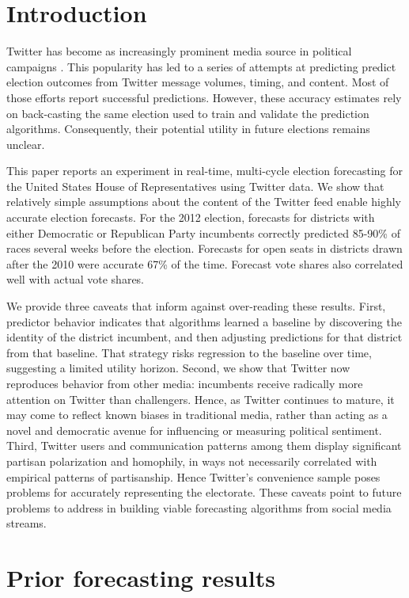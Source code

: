 \documentclass{acm_proc_article-sp}
\begin{document}
\section{Introduction}
\label{sec:introduction}

Twitter has become as increasingly prominent media source in political campaigns
\cite{economist2009,harden2009}. This popularity has led to a series
of attempts at predicting predict election outcomes from Twitter
message volumes, timing, and content. Most of those efforts report
successful predictions. However, these accuracy estimates rely on
back-casting the same election used to train and validate the
prediction algorithms. Consequently, their potential utility in future elections
remains unclear.

This paper reports an experiment in real-time, multi-cycle election forecasting for the
United States House of Representatives using Twitter data.
We show that relatively simple assumptions about the content of the
Twitter feed enable highly accurate election forecasts. For the 2012
election, forecasts for districts with either Democratic or Republican
Party incumbents correctly predicted 85-90\% of races several weeks
before the election. Forecasts for open seats in districts drawn after the 2010
 were accurate 67\% of the time. Forecast vote shares also correlated
well with actual vote shares.

We provide three caveats that inform against over-reading these
results. First, predictor behavior indicates that algorithms learned a
baseline by discovering the identity of the district incumbent, and
then adjusting predictions for that district from that baseline. That
strategy risks regression to the baseline over time, suggesting a
limited utility horizon. Second, we show that Twitter now reproduces
behavior from other media: incumbents receive radically more attention
on Twitter than challengers. Hence, as Twitter continues to mature, it
may come to reflect known biases in traditional media, rather than
acting as a novel and democratic avenue for influencing or measuring
political sentiment. Third, Twitter users and communication patterns
among them display significant partisan polarization and homophily, in
ways not necessarily correlated with empirical patterns of
partisanship. Hence Twitter's convenience sample poses problems for
accurately representing the electorate. These caveats point to future
problems to address in building viable forecasting algorithms from
social media streams.


\section{Prior forecasting results}
\label{sec:prior-forec-results}
\end{document}
